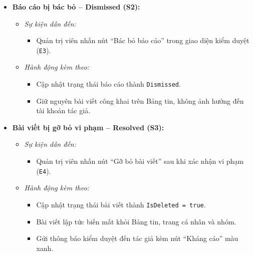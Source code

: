 \documentclass[11pt,a4paper]{article}
\begin{document}
\begin{itemize}[leftmargin=1.2cm, noitemsep]
    \item[\textbf{--}] \textbf{Báo cáo bị bác bỏ -- Dismissed (S2):}
    \begin{itemize}[leftmargin=0.8cm, label=--, noitemsep]
        \item \textit{Sự kiện dẫn đến:}
        \begin{itemize}[leftmargin=0.6cm, label=$\ast$, noitemsep]
            \item Quản trị viên nhấn nút ``Bác bỏ báo cáo'' trong giao diện kiểm duyệt (\texttt{E3}).
        \end{itemize}
        \item \textit{Hành động kèm theo:}
        \begin{itemize}[leftmargin=0.6cm, label=$\ast$, noitemsep]
            \item Cập nhật trạng thái báo cáo thành \texttt{Dismissed}.
            \item Giữ nguyên bài viết công khai trên Bảng tin, không ảnh hưởng đến tài khoản tác giả.
        \end{itemize}
    \end{itemize}

    \item[\textbf{--}] \textbf{Bài viết bị gỡ bỏ vi phạm -- Resolved (S3):}
    \begin{itemize}[leftmargin=0.8cm, label=--, noitemsep]
        \item \textit{Sự kiện dẫn đến:}
        \begin{itemize}[leftmargin=0.6cm, label=$\ast$, noitemsep]
            \item Quản trị viên nhấn nút ``Gỡ bỏ bài viết'' sau khi xác nhận vi phạm (\texttt{E4}).
        \end{itemize}
        \item \textit{Hành động kèm theo:}
        \begin{itemize}[leftmargin=0.6cm, label=$\ast$, noitemsep]
            \item Cập nhật trạng thái bài viết thành \texttt{IsDeleted = true}.
            \item Bài viết lập tức biến mất khỏi Bảng tin, trang cá nhân và nhóm.
            \item Gửi thông báo kiểm duyệt đến tác giả kèm nút ``Kháng cáo'' màu xanh.
        \end{itemize}
    \end{itemize}


\end{itemize}
\end{document}
